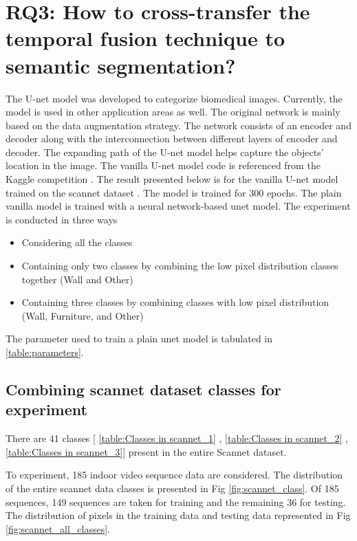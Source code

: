     \section{RQ3: How to cross-transfer the temporal fusion technique to semantic segmentation?}
    
    The U-net model was developed to categorize biomedical images. Currently, the model is used in other application areas as well. The original network is mainly based on the data augmentation strategy. The network consists of an encoder and decoder along with the interconnection between different layers of encoder and decoder. The expanding path of the U-net model helps capture the objects' location in the image. The vanilla U-net model code is referenced from the Kaggle competition \cite{85_kag_challenge}. The result presented below is for the vanilla U-net model trained on the scannet dataset \cite{79_dai2017scannet}. The model is trained for 300 epochs. The plain vanilla model is trained with a neural network-based unet model. The experiment is conducted in three ways
    \begin{itemize}
    	\item Considering all the classes
    	\item Containing only two classes by combining the low pixel distribution classes together (Wall and Other)
    	\item Containing three classes by combining classes with low pixel distribution (Wall, Furniture, and Other)
    \end{itemize}
    
    
    The parameter used to train a plain unet model is tabulated in \ref{table:parameters}.
    
    \subsection{Combining scannet dataset classes for experiment}
    
	There are 41 classes [ \ref{table:Classes in scannet_1} , \ref{table:Classes in scannet_2} , \ref{table:Classes in scannet_3}] present in the entire Scannet dataset. 

	To experiment, 185 indoor video sequence data are considered. The distribution of the entire scannet data classes is presented in Fig \ref{fig:scannet_class}. Of 185 sequences, 149 sequences are taken for training and the remaining 36 for testing. The distribution of pixels in the training data and testing data represented in Fig \ref{fig:scannet_all_classes}.
	
